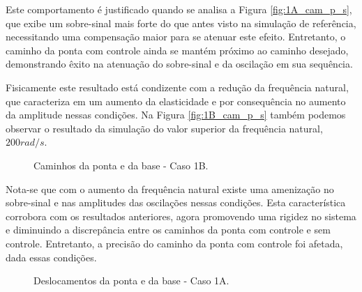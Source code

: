 Este comportamento é justificado quando se analisa a Figura \ref{fig:1A_cam_p_s}, que exibe um sobre-sinal mais forte do que antes visto na simulação de referência, necessitando uma compensação maior para se atenuar este efeito. Entretanto, o caminho da ponta com controle ainda se mantém próximo ao caminho desejado, demonstrando êxito na atenuação do sobre-sinal e da oscilação em sua sequência.


Fisicamente este resultado está condizente com a redução da frequência natural, que caracteriza em um aumento da elasticidade e por consequência no aumento da amplitude nessas condições. Na Figura \ref{fig:1B_cam_p_s} também podemos observar o resultado da simulação do valor superior da frequência natural, \(200 rad/s\). 

\begin{figure}[H]
    \centering
    \hfill
    \hfill
    \hfill
    \caption{Caminhos da ponta e da base - Caso 1B.}
    \label{fig:1B_cam}
\end{figure}

Nota-se que com o aumento da frequência natural existe uma amenização no sobre-sinal e nas amplitudes das oscilações nessas condições. Esta característica corrobora com os resultados anteriores, agora promovendo uma rigidez no sistema e diminuindo a discrepância entre os caminhos da ponta com controle e sem controle. Entretanto, a precisão do caminho da ponta com controle foi afetada, dada essas condições.


\begin{figure}[H]
    \centering
    \hfill
    \caption{Deslocamentos da ponta e da base - Caso 1A.}
    \label{fig:1A_des}
\end{figure}

